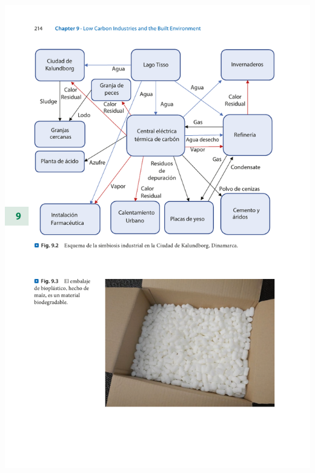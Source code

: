 \documentclass[runningheads]{llncs}
\begin{document}
\includegraphics[scale=0.95]{9(3).pdf}
\end{document}
